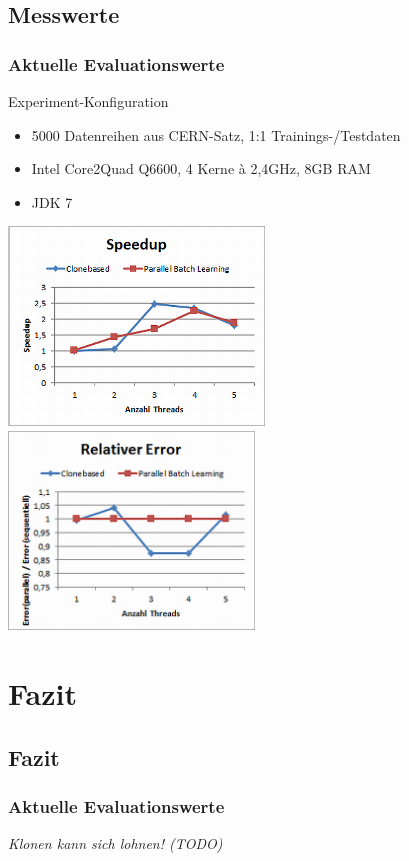 \documentclass[18pt]{beamer}
\begin{document}
	\subsection{Messwerte}
	\begin{frame}\frametitle{Aktuelle Evaluationswerte}
		\begin{block}{Experiment-Konfiguration}
			\begin{itemize}
				\item 5000 Datenreihen aus CERN-Satz, 1:1 Trainings-/Testdaten
				\item Intel Core2Quad Q6600, 4 Kerne à 2,4GHz, 8GB RAM
				\item JDK 7
			\end{itemize}
		\end{block}
		\includegraphics[width=0.51\textwidth]{images/eval_speedup.png}
		\includegraphics[width=0.49\textwidth]{images/eval_error.png}
	\end{frame}
	\section{Fazit}
	\subsection{Fazit}
	\begin{frame}\frametitle{Aktuelle Evaluationswerte}
		\textit{Klonen kann sich lohnen! (TODO)}
	\end{frame}
\end{document}
